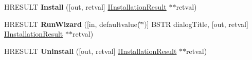 \begin{DoxyCompactItemize}
\item 
\mbox{\label{interface_w_u_api_lib_1_1_i_update_installer_ae37c1ae0ff8b1cfe54179d291107475d}} 
H\+R\+E\+S\+U\+LT {\bfseries Install} (\mbox{[}out, retval\mbox{]} \hyperlink{interface_w_u_api_lib_1_1_i_installation_result}{I\+Installation\+Result} $\ast$$\ast$retval)
\item 
\mbox{\label{interface_w_u_api_lib_1_1_i_update_installer_aa240ab2adafb1c1768c5e4ed426eadf0}} 
H\+R\+E\+S\+U\+LT {\bfseries Run\+Wizard} (\mbox{[}in, defaultvalue(\char`\"{}\char`\"{})\mbox{]} B\+S\+TR dialog\+Title, \mbox{[}out, retval\mbox{]} \hyperlink{interface_w_u_api_lib_1_1_i_installation_result}{I\+Installation\+Result} $\ast$$\ast$retval)
\item 
\mbox{\label{interface_w_u_api_lib_1_1_i_update_installer_a1e66630a8122d71b8299c8e4c6c60bfe}} 
H\+R\+E\+S\+U\+LT {\bfseries Uninstall} (\mbox{[}out, retval\mbox{]} \hyperlink{interface_w_u_api_lib_1_1_i_installation_result}{I\+Installation\+Result} $\ast$$\ast$retval)
\end{DoxyCompactItemize}
